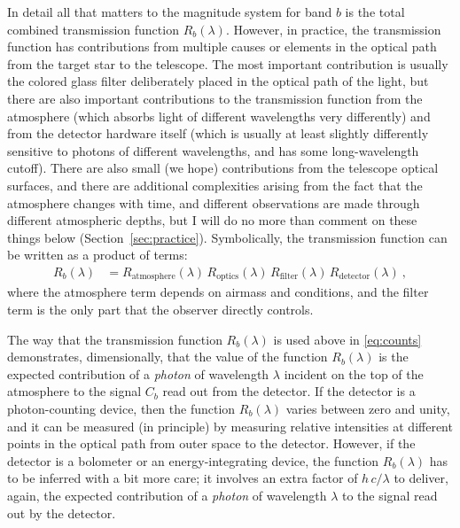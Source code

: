 \documentclass[10pt]{article}
\newcommand{\sectionname}{Section}
\newcommand{\secref}[1]{\sectionname~\ref{#1}}
\begin{document}
In detail all that matters to the magnitude system for band $b$ is the total combined transmission function $R_b(\lambda)$.
However, in practice, the transmission function has contributions from multiple causes or elements in the optical path from the target star to the telescope.
The most important contribution is usually the colored glass filter deliberately placed in the optical path of the light, but there are also important contributions to the transmission function from the atmosphere (which absorbs light of different wavelengths very differently) and from the detector hardware itself (which is usually at least slightly differently sensitive to photons of different wavelengths, and has some long-wavelength cutoff).
There are also small (we hope) contributions from the telescope optical surfaces,
and there are additional complexities arising from the fact that the atmosphere changes with time, and different observations are made through different atmospheric depths, but I will do no more than comment on these things below (\secref{sec:practice}).
Symbolically, the transmission function can be written as a product of terms:
\begin{align}
    R_b(\lambda) &= R_\text{atmosphere}(\lambda)\,R_\text{optics}(\lambda)\,R_\text{filter}(\lambda)\,R_\text{detector}(\lambda)~,
\end{align}
where the atmosphere term depends on airmass and conditions, and the filter term is the only part that the observer directly controls.

The way that the transmission function $R_b(\lambda)$ is used above in \eqref{eq:counts} demonstrates, dimensionally,
that the value of the function $R_b(\lambda)$ is the expected contribution of a \emph{photon} of wavelength
$\lambda$ incident on the top of the atmosphere to the signal $C_b$ read out from the detector.
If the detector is a photon-counting device, then the function $R_b(\lambda)$ varies between zero and unity, and it can
be measured (in principle) by measuring relative intensities at different points in the optical path from outer space
to the detector.
However, if the detector is a bolometer or an energy-integrating device, the function $R_b(\lambda)$ has to be inferred
with a bit more care; it involves an extra factor of $h\,c/\lambda$ to deliver, again, the expected contribution of
a \emph{photon} of wavelength $\lambda$ to the signal read out by the detector.
\end{document}
